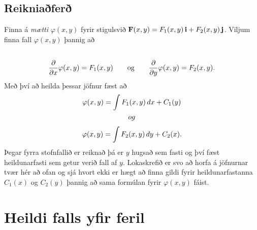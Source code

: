 \documentclass[a4paper,10pt,icelandic]{sphinxmanual}
\begin{document}
\subsection{Reikniaðferð}
\label{Kafli5:reikniafer}
Finna á \textit{mætti} \(\varphi(x,y)\) fyrir stigulsvið
\(\mbox{${\bf F}$}(x,y)=F_1(x,y)\,\mbox{${\bf i}$}+F_2(x,y)\,\mbox{${\bf j}$}\).
Viljum finna fall \(\varphi(x,y)\) þannig að
\begin{gather}
\begin{split}\displaystyle\end{split}\notag\\\begin{split}\frac{\partial}{\partial x}\varphi(x,y)=F_1(x,y)\qquad
\mbox{og}\qquad \frac{\partial}{\partial y}\varphi(x,y)=F_2(x,y).\end{split}\notag
\end{gather}
Með því að heilda þessar jöfnur fæst að
\begin{gather}
\begin{split}\displaystyle \varphi(x,y)=\int F_1(x,y)\,dx+C_1(y)\end{split}\notag\\\begin{split}og\end{split}\notag
\end{gather}\begin{gather}
\begin{split}\displaystyle \varphi(x,y)=\int F_2(x,y)\,dy+C_2(x).\end{split}\notag
\end{gather}
Þegar fyrra stofnfallið er reiknað þá er \(y\) hugsað sem fasti og
því fæst heildunarfasti sem getur verið fall af \(y\). Lokaskrefið
er svo að horfa á jöfnurnar tvær hér að ofan og sjá hvort ekki er hægt
að finna gildi fyrir heildunarfastanna \(C_1(x)\) og \(C_2(y)\)
þannig að sama formúlan fyrir \(\varphi(x,y)\) fáist.


\section{Heildi falls yfir feril}
\label{Kafli5:index-3}\label{Kafli5:heildi-falls-yfir-feril}
\end{document}
